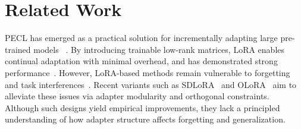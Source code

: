 \documentclass{article}
\newcommand{\minisection}[1]{\vspace{0.0in} \noindent {\bf #1}}
\theoremstyle{plain}
\theoremstyle{definition}
\theoremstyle{remark}
\begin{document}
\begin{itemize}



\end{itemize}

\section{Related Work}

\minisection{LoRA-Based CL.}
PECL has emerged as a practical solution for incrementally adapting large pre-trained models
~\cite{pmlr-v97-houlsby19a,Wang_2022_CVPR,dingParameterefficientFinetuningLargescale2023,xu2023parameterefficientfinetuningmethodspretrained}. By introducing trainable low-rank matrices, LoRA enables continual adaptation with minimal overhead, and has demonstrated strong performance~\cite{hu_lora_2021}.
However, LoRA-based methods remain vulnerable to forgetting and task interferences~\cite{Gao_2023_ICCV,10.1145/3730436.3730456,yang2024parametercollisionhinderingcontinual}. 
Recent variants such as SDLoRA~\cite{wu2025sdlorascalabledecoupledlowrank} and OLoRA~\cite{NEURIPS2020_70d85f35,wang2023orthogonal} aim to alleviate these issues via adapter modularity and orthogonal constraints. 
Although such designs yield empirical improvements, they lack a principled understanding of how adapter structure affects forgetting and generalization.
\end{document}
